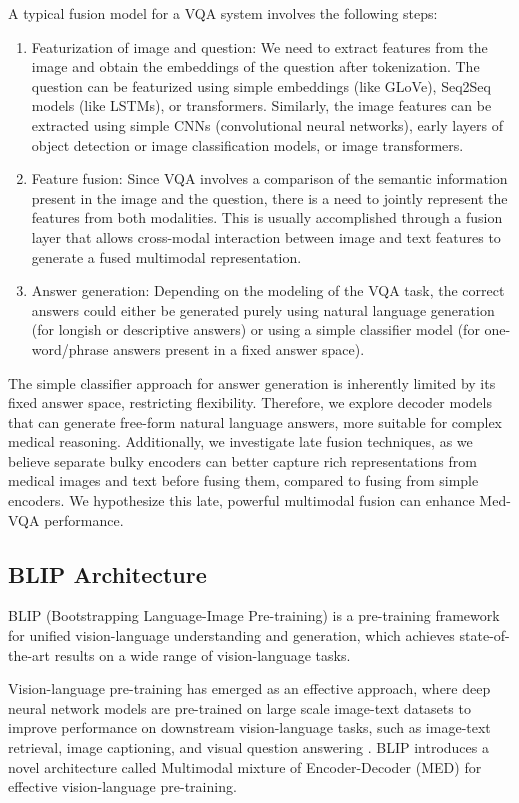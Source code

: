 \documentclass[pdflatex,sn-mathphys-num]{sn-jnl}%
\begin{document}
A typical fusion model for a VQA system involves the following steps:
\begin{enumerate}
\item Featurization of image and question: We need to extract features from the image and obtain the embeddings of the question after tokenization. The question can be featurized using simple embeddings (like GLoVe), Seq2Seq models (like LSTMs), or transformers. Similarly, the image features can be extracted using simple CNNs (convolutional neural networks), early layers of object detection or image classification models, or image transformers.
\item Feature fusion: Since VQA involves a comparison of the semantic information present in the image and the question, there is a need to jointly represent the features from both modalities. This is usually accomplished through a fusion layer that allows cross-modal interaction between image and text features to generate a fused multimodal representation.
\item Answer generation: Depending on the modeling of the VQA task, the correct answers could either be generated purely using natural language generation (for longish or descriptive answers) or using a simple classifier model (for one-word/phrase answers present in a fixed answer space).
\end{enumerate}


The simple classifier approach for answer generation is inherently limited by its fixed answer space, restricting flexibility. Therefore, we explore decoder models that can generate free-form natural language answers, more suitable for complex medical reasoning. Additionally, we investigate late fusion techniques, as we believe separate bulky encoders can better capture rich representations from medical images and text before fusing them, compared to fusing from simple encoders. We hypothesize this late, powerful multimodal fusion can enhance Med-VQA performance. 

\subsection{BLIP Architecture}\label{subsec2.2}
BLIP (Bootstrapping Language-Image Pre-training) \cite{li2022blip} is a pre-training framework for unified vision-language understanding and generation, which achieves state-of-the-art results on a wide range of vision-language tasks.


Vision-language pre-training has emerged as an effective approach, where deep neural network models are pre-trained on large scale image-text datasets to improve performance on downstream vision-language tasks, such as image-text retrieval, image captioning, and visual question answering \cite{li2022blipblog}. BLIP introduces a novel architecture called Multimodal mixture of Encoder-Decoder (MED) for effective vision-language pre-training.
\end{document}
